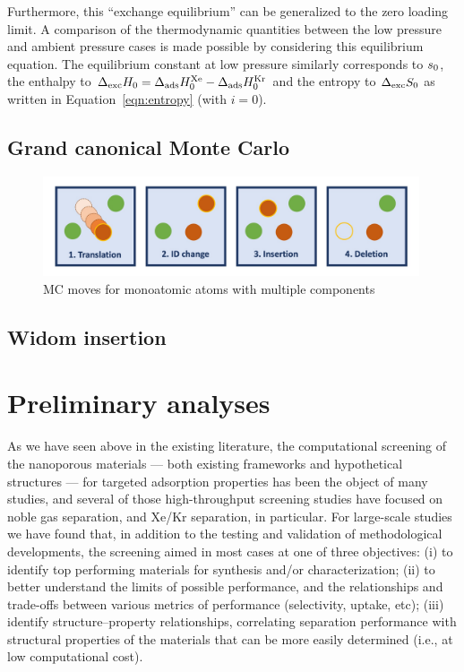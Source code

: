 \documentclass[main]{subfiles}
\begin{document}
Furthermore, this ``exchange equilibrium'' can be generalized to the zero loading limit. A comparison of the thermodynamic quantities between the low pressure and ambient pressure cases is made possible by considering this equilibrium equation. The equilibrium constant at low pressure similarly corresponds to $s_{\text{0}}$, the enthalpy to $\Delta_{\text{exc}}H_{\text{0}} = \Delta_{\text{ads}}H_{\text{0}}^{\text{Xe}} - \Delta_{\text{ads}}H_{\text{0}}^{\text{Kr}}$ and the entropy to $\Delta_{\text{exc}}S_{\text{0}}$ as written in Equation~\ref{eqn:entropy} (with $i = 0$).


\subsection{Grand canonical Monte Carlo}

\begin{figure}[ht]
  \centering
  \includegraphics[width=0.99\textwidth]{figures/2-thermo/MC_moves.jpg}
  \caption{MC moves for monoatomic atoms with multiple components}
\end{figure}

\subsection{Widom insertion}



\section{Preliminary analyses}

As we have seen above in the existing literature, the computational screening of the nanoporous materials --- both existing frameworks and hypothetical structures --- for targeted adsorption properties has been the object of many studies, and several of those high-throughput screening studies have focused on noble gas separation, and Xe/Kr separation, in particular. For large-scale studies we have found that, in addition to the testing and validation of methodological developments, the screening aimed in most cases at one of three objectives: (i) to identify top performing materials for synthesis and/or characterization; (ii) to better understand the limits of possible performance, and the relationships and trade-offs between various metrics of performance (selectivity, uptake, etc); (iii) identify structure--property relationships, correlating separation performance with structural properties of the materials that can be more easily determined (i.e., at low computational cost).
\end{document}

